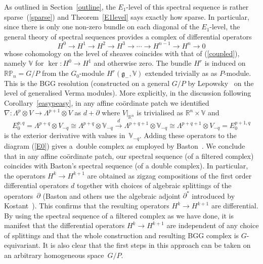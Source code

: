 \documentclass[11pt]{article}
\begin{document}
As outlined in Section~\ref{outline}, the $E_1$-level of this spectral sequence is
rather sparse~(\ref{sparse}) and Theorem~\ref{E1level} says exactly how sparse.
In particular, since there is only one non-zero bundle on each diagonal of the
$E_1$-level, the general theory of spectral sequences provides a complex of
dif\/ferential operators
\[H^0\to H^1\to H^2\to H^3\to\cdots\to H^{n-1}\to H^n\to 0\]
whose cohomology on the level of sheaves coincides with that of
(\ref{coupled}), namely ${\mathbb{V}}$ for $\ker:H^0\to H^1$ and otherwise
zero. The bundle $H^r$ is induced on ${\mathbb{RP}}_n=G/P$ from the
$G_0$-module $H^r({\mathfrak{g}}_-,{\mathbb{V}})$ extended trivially as as
$P$-module. This is the BGG resolution (constructed on a general $G/P$ by
Lepowsky~\cite{l} on the level of generalised Verma modules). More explicitly,
in the discussion following Corollary~\ref{easypeasy}, in any af\/f\/ine
co\"ordinate patch we identif\/ied
$\nabla:\Lambda^p\otimes V\to\Lambda^{p+1}\otimes V$ as $d+\partial$ where
$V|_{{\mathbb{R}}^n}$ is trivialised as ${\mathbb{R}}^n\times{\mathbb{V}}$ and
\[E_0^{p,q}=\Lambda^{p+q}\otimes V_{-q}\cong
\Lambda^{p+q}\otimes{\mathbb{V}}_{-q}\stackrel{d}{\longrightarrow}
\Lambda^{p+q+1}\otimes{\mathbb{V}}_{-q}\cong\Lambda^{p+q+1}\otimes V_{-q}=
E_0^{p+1,q}\]
is the exterior derivative with values in~${\mathbb{V}}_{-q}$. Adding these
operators to the diagram (\ref{E0}) gives a~double complex as employed by
Baston~\cite[p.~120]{b}. We conclude that in any af\/f\/ine co\"ordinate patch, our
spectral sequence (of a f\/iltered complex) coincides with Baston's spectral
sequence (of a double complex). In particular, the operators $H^k\to H^{k+1}$
are obtained as zigzag compositions of the f\/irst order dif\/ferential operators
$d$ together with choices of algebraic splittings of the operators~$\partial$
(Baston and others use the algebraic adjoint $\partial^*$ introduced by
Kostant~\cite{k}). This conf\/irms that the resulting operators $H^k\to H^{k+1}$
are dif\/ferential. By using the spectral sequence of a f\/iltered complex as we
have done, it is manifest that the dif\/ferential operators $H^k\to H^{k+1}$ are
independent of any choice of splittings and that the whole construction and
resulting BGG complex is $G$-equivariant. It is also clear that the f\/irst steps
in this approach can be taken on an arbitrary homogeneous space~$G/P$.
\end{document}

